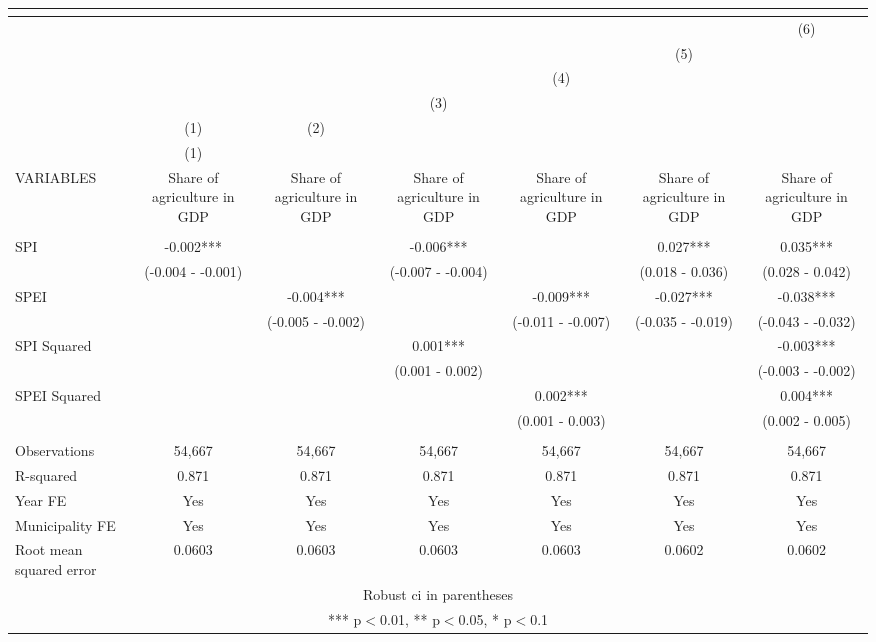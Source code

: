 \begin{tabular}{lcccccc}
\multicolumn{7}{c}{} \\ \hline
 &  &  &  &  &  & (6) \\
 &  &  &  &  & (5) &  \\
 &  &  &  & (4) &  &  \\
 &  &  & (3) &  &  &  \\
 & (1) & (2) &  &  &  &  \\
 & (1) &  &  &  &  &  \\
VARIABLES & Share of agriculture in GDP & Share of agriculture in GDP & Share of agriculture in GDP & Share of agriculture in GDP & Share of agriculture in GDP & Share of agriculture in GDP \\ \hline
 &  &  &  &  &  &  \\
SPI & -0.002*** &  & -0.006*** &  & 0.027*** & 0.035*** \\
 & (-0.004 - -0.001) &  & (-0.007 - -0.004) &  & (0.018 - 0.036) & (0.028 - 0.042) \\
SPEI &  & -0.004*** &  & -0.009*** & -0.027*** & -0.038*** \\
 &  & (-0.005 - -0.002) &  & (-0.011 - -0.007) & (-0.035 - -0.019) & (-0.043 - -0.032) \\
SPI Squared &  &  & 0.001*** &  &  & -0.003*** \\
 &  &  & (0.001 - 0.002) &  &  & (-0.003 - -0.002) \\
SPEI Squared &  &  &  & 0.002*** &  & 0.004*** \\
 &  &  &  & (0.001 - 0.003) &  & (0.002 - 0.005) \\
 &  &  &  &  &  &  \\
Observations & 54,667 & 54,667 & 54,667 & 54,667 & 54,667 & 54,667 \\
R-squared & 0.871 & 0.871 & 0.871 & 0.871 & 0.871 & 0.871 \\
Year FE & Yes & Yes & Yes & Yes & Yes & Yes \\
Municipality FE & Yes & Yes & Yes & Yes & Yes & Yes \\
 Root mean squared error & 0.0603 & 0.0603 & 0.0603 & 0.0603 & 0.0602 & 0.0602 \\ \hline
\multicolumn{7}{c}{ Robust ci in parentheses} \\
\multicolumn{7}{c}{ *** p$<$0.01, ** p$<$0.05, * p$<$0.1} \\
\end{tabular}
